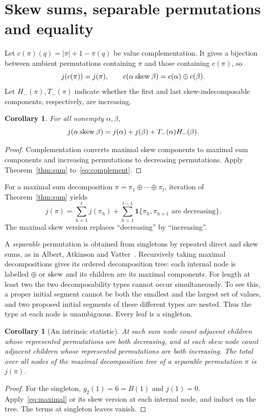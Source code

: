 \documentclass[11pt,a4paper]{article}
\newtheorem{corollary}[theorem]{Corollary}
\theoremstyle{remark}
\newcommand{\ind}{\mathbf{1}}
\begin{document}
\section{Skew sums, separable permutations and equality}\label{sec:consequences}

Let $c(\pi)(q)=|\pi|+1-\pi(q)$ be value complementation. It gives a
bijection between ambient permutations containing $\pi$ and those
containing $c(\pi)$, so
\begin{equation}\label{eq:complement}
 j(c(\pi))=j(\pi),\qquad
 c(\alpha\mathbin{\mathrm{skew}}\beta)=c(\alpha)\oplus c(\beta).
\end{equation}
Let $H_-(\pi),T_-(\pi)$ indicate whether the first and last
skew-indecomposable components, respectively, are increasing.

\begin{corollary}\label{cor:skew}
For all nonempty $\alpha,\beta$,
\[
 j(\alpha\mathbin{\mathrm{skew}}\beta)=j(\alpha)+j(\beta)+T_-(\alpha)H_-(\beta).
\]
\end{corollary}
\begin{proof}
Complementation converts maximal skew components to maximal sum
components and increasing permutations to decreasing permutations.
Apply Theorem~\ref{thm:sum} to~\eqref{eq:complement}.
\end{proof}

For a maximal sum decomposition $\pi=\pi_1\oplus\cdots\oplus\pi_t$,
iteration of Theorem~\ref{thm:sum} yields
\begin{equation}\label{eq:maximal}
 j(\pi)=\sum_{h=1}^{t}j(\pi_h)
 +\sum_{h=1}^{t-1}\ind\{\pi_h,\pi_{h+1}\text{ are decreasing}\}.
\end{equation}
The maximal skew version replaces ``decreasing'' by ``increasing''.

A \emph{separable} permutation is obtained from singletons by repeated
direct and skew sums, as in Albert, Atkinson and
Vatter~\cite[Section~1]{albert}. Recursively taking maximal decompositions
gives its ordered decomposition tree: each internal node is labelled
$\oplus$ or $\mathbin{\mathrm{skew}}$ and its children are its maximal components.
For length at least two the two decomposability types cannot occur
simultaneously. To see this, a proper initial segment cannot be both
the smallest and the largest set of values, and two proposed initial
segments of these different types are nested. Thus the type at each
node is unambiguous. Every leaf is a singleton.

\begin{corollary}[An intrinsic statistic]\label{cor:tree}
At each sum node count adjacent children whose represented permutations
are both decreasing, and at each skew node count adjacent children whose
represented permutations are both increasing. The total over all nodes
of the maximal decomposition tree of a separable permutation $\pi$ is
$j(\pi)$.
\end{corollary}
\begin{proof}
For the singleton, $g_2(1)=6=B(1)$ and $j(1)=0$.
Apply~\eqref{eq:maximal} or its skew version at each internal node,
and induct on the tree. The terms at singleton leaves vanish.
\end{proof}
\end{document}
